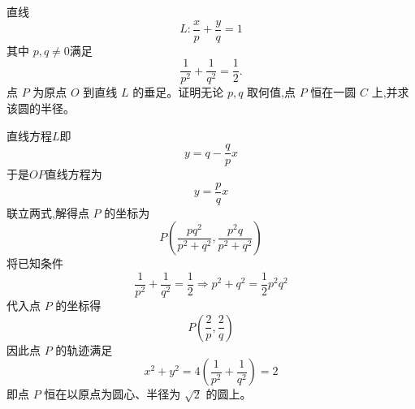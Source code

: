 \begin{questions}

    \question 直线
    \[
    L:\frac{x}{p}+\frac{y}{q}=1
    \]
    其中 $p,q\neq 0$满足
    \[
    \frac{1}{p^2}+\frac{1}{q^2}=\frac{1}{2}.
    \]
    点 $P$ 为原点 $O$ 到直线 $L$ 的垂足。证明无论 $p,q$ 取何值,点 $P$ 恒在一圆 $C$ 上,并求该圆的半径。
    \begin{solution}
        直线方程$L$即
        \[
        y=q-\frac{q}{p}x
        \]
        于是$OP$直线方程为
        \[
        y=\frac{p}{q}x
        \]
        联立两式,解得点 $P$ 的坐标为
        \[
        P\left(\frac{pq^2}{p^2+q^2},\frac{p^2q}{p^2+q^2}\right)
        \]
        将已知条件
        \[
        \frac{1}{p^2}+\frac{1}{q^2}=\frac{1}{2}\Rightarrow p^2+q^2=\frac{1}{2}p^2q^2
        \]
        代入点 $P$ 的坐标得
        \[
        P\left(\frac{2}{p},\frac{2}{q}\right)
        \]
        因此点 $P$ 的轨迹满足
        \[
        x^2+y^2=4\left(\frac{1}{p^2}+\frac{1}{q^2}\right)=2
        \]
        即点 $P$ 恒在以原点为圆心、半径为 $\sqrt{2}$ 的圆上。
    \end{solution}


\end{questions}
